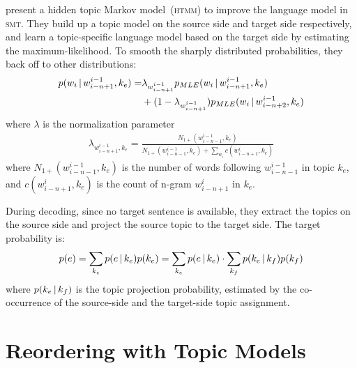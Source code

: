 \citet{Yu-2013} present a hidden topic Markov model~(\textsc{htmm}) to improve
the language model in \textsc{smt}. They build up a topic model on the
source side and target side respectively, and learn a topic-specific
language model based on the target side by estimating the
maximum-likelihood. To smooth the sharply distributed probabilities,
they back off to other distributions:
\begin{align}
p(w_i \, | \, w^{i-1}_{i-n+1}, k_e) = &\lambda_{w^{i-1}_{i-n+1}}
                                   p_{MLE}(w_i \, | \, w^{i-1}_{i-n+1}, k_e) \\
&+ (1- \lambda_{w^{i-1}_{i-n+1}})p_{MLE}(w_i \, | \, w^{i-1}_{i-n+2}, k_e)
\end{align}
where $\lambda$ is the normalization parameter
\begin{align}
\lambda_{w^{i-1}_{i-n+1}, k_e} = \frac{N_{1+}(w^{i-1}_{i-n-1},
  k_e)}{N_{1+}(w^{i-1}_{i-n-1}, k_e) + \sum_{w_i}c(w^i_{i-n+1}, k_e)}
\end{align}
where $N_{1+}(w^{i-1}_{i-n-1}, k_e)$ is the number of words following
$w^{i-1}_{i-n-1}$ in topic $k_e$, and $c(w^i_{i-n+1}, k_e)$ is the
count of n-gram $w^i_{i-n+1}$ in $k_e$.

During decoding, since no target sentence is available, they extract the topics on the 
source side and project the source topic to the target side. 
The target probability is:
\begin{align}
p(e) = \sum_{k_e} p(e \, | \, k_e) p(k_e) = \sum_{k_e} p(e \, | \, k_e) \cdot
  \sum_{k_f} p(k_e \, | \, k_f) p (k_f)
\end{align}
where $p(k_e \, | \, k_f)$ is the topic projection probability, estimated by
the co-occurrence of the source-side and the target-side topic assignment.


\section{Reordering with Topic Models}

